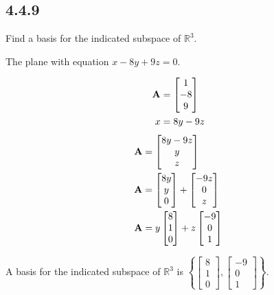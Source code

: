 \documentclass{article}
\begin{document}
\subsection{4.4.9}

Find a basis for the indicated subspace of $ \mathbb{R}^3 $.

The plane with equation $ x - 8y + 9z = 0 $.

\begin{align*}
	\matr{A} & = \begin{bmatrix*} 1 \\ -8 \\ 9 \end{bmatrix*} \\
	x & = 8y - 9z
\end{align*}
\begin{align*}
	\mathbf{A} & = \begin{bmatrix} 8y - 9z \\ y \\ z \end{bmatrix} \\
	\mathbf{A} & =
		\begin{bmatrix} 8y \\ y \\ 0 \end{bmatrix}
		+ \begin{bmatrix} -9z \\ 0 \\ z \end{bmatrix} \\
	\mathbf{A} & =
		y \begin{bmatrix} 8 \\ 1 \\ 0 \end{bmatrix}
		+ z \begin{bmatrix} -9 \\ 0 \\ 1 \end{bmatrix}
\end{align*}
\begin{mdframed}
	A basis for the indicated subspace of $ \mathbb{R}^3 $ is $ \left\{ \begin{bmatrix} 8 \\ 1 \\ 0 \end{bmatrix}, \begin{bmatrix} -9 \\ 0 \\ 1 \end{bmatrix} \right\} $.
\end{mdframed}
\end{document}
